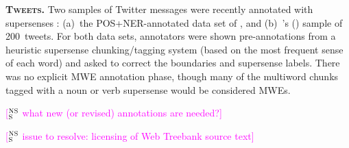 \documentclass[11pt]{article}
\newcommand{\citeposs}[1]{\citeauthor{#1}'s (\citeyear{#1})}
\newcommand{\ensuretext}[1]{#1}
\newcommand{\nssmarker}{\ensuretext{\textcolor{magenta}{\ensuremath{^{\textsc{NS}}_{\textsc{S}}}}}}
\newcommand{\arkcomment}[3]{\ensuretext{\textcolor{#3}{[#1 #2]}}}
\newcommand{\nss}[1]{\arkcomment{\nssmarker}{#1}{magenta}}
\begin{document}
\textbf{\textsc{Tweets}.} Two samples of Twitter messages were recently annotated with supersenses \citep{johannsen-14}: 
(a)~the POS+NER-annotated data set of \citet{Ritter:ea:11}, 
and %
(b)~\citeposs{Plank:ea:14} sample of 200~tweets.
For both data sets, annotators were shown pre-annotations from a heuristic supersense chunking\slash tagging system 
(based on the most frequent sense of each word)
and asked to correct the boundaries and supersense labels. 
There was no explicit MWE annotation phase, 
though many of the multiword chunks tagged with a noun or verb supersense would be considered MWEs. 


\nss{what new (or revised) annotations are needed?} 


\nss{issue to resolve: licensing of Web Treebank source text}
\end{document}
